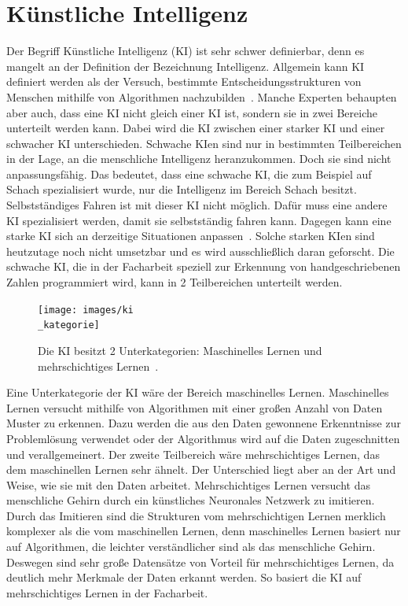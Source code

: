 \documentclass[11pt]{article}
\begin{document}
\section{Künstliche Intelligenz}
Der Begriff Künstliche Intelligenz (KI) ist sehr schwer definierbar, denn es mangelt an der Definition der Bezeichnung Intelligenz.
Allgemein kann KI definiert werden als der Versuch, bestimmte Entscheidungsstrukturen von Menschen mithilfe von
Algorithmen nachzubilden~\cite{4}. Manche Experten behaupten aber auch, dass eine KI nicht gleich einer KI ist, sondern sie in zwei Bereiche unterteilt werden kann.
Dabei wird die KI zwischen einer starker KI und einer schwacher KI unterschieden. Schwache KIen sind nur in bestimmten Teilbereichen in der Lage,
an die menschliche Intelligenz heranzukommen. Doch sie sind nicht anpassungsfähig. Das bedeutet, dass eine schwache KI, die zum Beispiel auf Schach
spezialisiert wurde, nur die Intelligenz im Bereich Schach besitzt. Selbstständiges Fahren ist mit dieser KI nicht möglich. Dafür muss eine
andere KI spezialisiert werden, damit sie selbstständig fahren kann. Dagegen kann eine starke KI sich an derzeitige Situationen anpassen~\cite{2}.
Solche starken KIen sind heutzutage noch nicht umsetzbar und es wird ausschließlich daran geforscht.
Die schwache KI, die in der Facharbeit speziell zur Erkennung von handgeschriebenen Zahlen programmiert wird, kann in 2 Teilbereichen
unterteilt werden.
\begin{figure}[h]
    \centering
    \texttt{[image: images/ki\\\_kategorie]}
    \caption[Unterkategorien der Künstliche Intelligenz~\cite{4}]{Die KI besitzt 2 Unterkategorien: Maschinelles Lernen und mehrschichtiges Lernen~\cite{4}.}
\end{figure}
Eine Unterkategorie der KI wäre der Bereich maschinelles Lernen. Maschinelles Lernen versucht mithilfe von Algorithmen mit einer großen Anzahl von
Daten Muster zu erkennen. Dazu werden die aus den Daten gewonnene Erkenntnisse zur Problemlösung verwendet oder der Algorithmus wird auf
die Daten zugeschnitten und verallgemeinert.
Der zweite Teilbereich wäre mehrschichtiges Lernen, das dem maschinellen Lernen sehr ähnelt. Der Unterschied liegt aber an der Art und Weise, wie
sie mit den Daten arbeitet. Mehrschichtiges Lernen versucht das menschliche Gehirn durch ein künstliches Neuronales Netzwerk zu imitieren.
Durch das Imitieren sind die Strukturen vom mehrschichtigen Lernen merklich komplexer als die vom maschinellen Lernen, denn
maschinelles Lernen basiert nur auf Algorithmen, die leichter verständlicher sind als das menschliche Gehirn. Deswegen sind
sehr große Datensätze von Vorteil für mehrschichtiges Lernen, da deutlich mehr Merkmale der Daten erkannt werden. So basiert die KI auf
mehrschichtiges Lernen in der Facharbeit.
\end{document}
